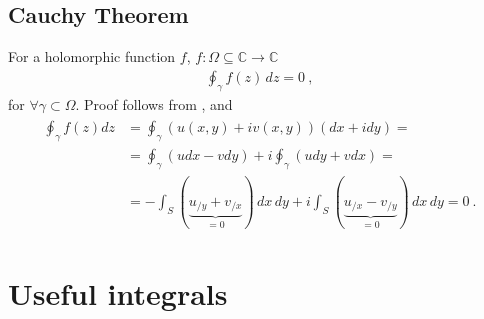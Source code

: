 \documentclass[letterpaper,10pt,english]{jupyterBook}
\begin{document}
\subsection{Cauchy Theorem}
\label{\detokenize{ch/complex/analysis:cauchy-theorem}}\label{\detokenize{ch/complex/analysis:complex-analysis-holo-fun-cauchy-thm}}
\sphinxAtStartPar
For a holomorphic function \(f\), \(f: \Omega \subseteq \mathbb{C} \rightarrow \mathbb{C}\)
\begin{equation*}
\begin{split}\oint_{\gamma} f(z) \, dz = 0 \ ,\end{split}
\end{equation*}
\sphinxAtStartPar
for \(\forall \gamma \subset \Omega\). Proof follows from {\hyperref[\detokenize{ch/multivariable/intro:multivariable-calculus-green-lemma}]{}}, and {\hyperref[\detokenize{ch/complex/analysis:complex-analysis-holo-fun-cauchy-riemann}]{}}
\begin{equation*}
\begin{split}\begin{aligned}
  \oint_{\gamma} f(z) dz & = \oint_{\gamma} \left( u(x,y) + i v(x,y) \right) \left( dx + i dy \right) = \\
  & = \oint_{\gamma} \left( u dx - v dy \right) + i \oint_{\gamma} \left( u dy + v dx \right) = \\
  & = - \int_{S} \left( \underbrace{u_{/y} + v_{/x}}_{=0} \right) \, dx \, dy + i \int_{S} \left( \underbrace{u_{/x} - v_{/y}}_{=0}  \right) \, dx \, dy = 0 \ .
\end{aligned}\end{split}
\end{equation*}

\section{Useful integrals}
\label{\detokenize{ch/complex/analysis:useful-integrals}}\label{\detokenize{ch/complex/analysis:complex-analysis-useful-int}}
\end{document}
